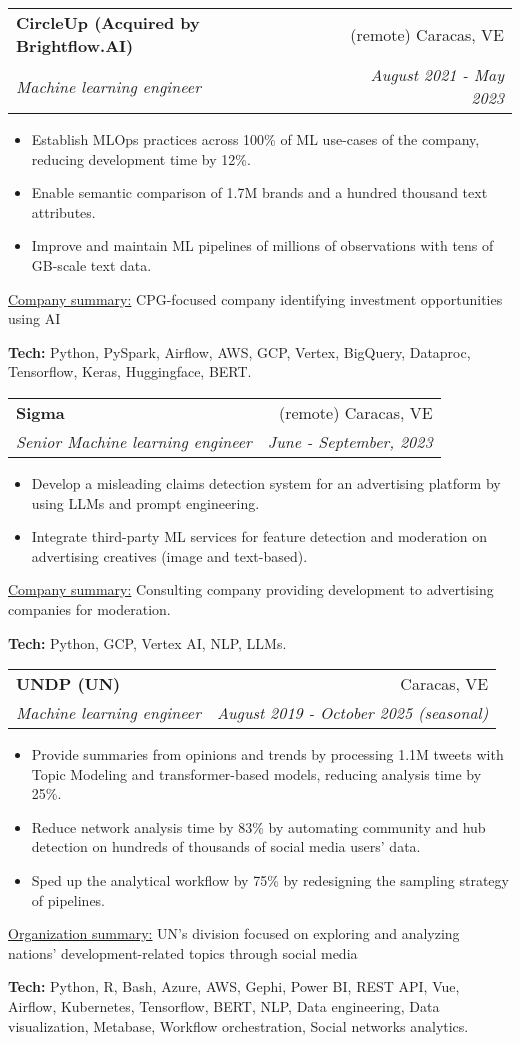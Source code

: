 \documentclass[letterpaper,11pt]{article}
\makeatletter
\newcommand{\sepsection}{\vspace{25pt}}
\newcommand{\resumeItem}[1]{%
  \item\small{
    #1
  }
}
\newcommand{\resumeSubheading}[4]{
  \vspace{8pt}\item%
    \begin{tabular*}{0.97\textwidth}[t]{l@{\extracolsep{\fill}}r}
      \textbf{#1} & #2 \\
      \textit{\small#3} & \textit{\small #4} \\
    \end{tabular*}\vspace{-5pt}
}
\newcommand{\resumeItemListStart}{\begin{itemize}}
\newcommand{\resumeItemListEnd}{\end{itemize}\vspace{-5pt}}
\newcommand{\resumeTech}[2]{
 \underline{#1:} #2
}
\makeatother
\begin{document}
    \resumeSubheading
      {CircleUp (Acquired by Brightflow.AI)}{(remote) Caracas, VE}
      {Machine learning engineer}{August 2021 - May 2023}
      \resumeItemListStart
      \resumeItem{Establish MLOps practices across 100\% of ML use-cases of the company, reducing development time by 12\%.}
      \resumeItem{Enable semantic comparison of 1.7M brands and a hundred thousand text attributes.}
      \resumeItem{Improve and maintain ML pipelines of millions of observations with tens of GB-scale text data.}
      \resumeItemListEnd
      \resumeTech{Company summary}{CPG-focused company identifying investment opportunities using AI}
      \begin{tcolorbox}
          \textbf{Tech:} Python, PySpark, Airflow, AWS, GCP, Vertex, BigQuery, Dataproc, Tensorflow, Keras, Huggingface, BERT.
      \end{tcolorbox}
    \sepsection

    \resumeSubheading
      {Sigma}{(remote) Caracas, VE}
      {Senior Machine learning engineer}{June - September, 2023}
      \resumeItemListStart
      \resumeItem{Develop a misleading claims detection system for an advertising platform by using LLMs and prompt engineering.}
      \resumeItem{Integrate third-party ML services for feature detection and moderation on advertising creatives (image and text-based).}
      \resumeItemListEnd
      \resumeTech{Company summary}{Consulting company providing development to advertising companies for moderation.}
      \begin{tcolorbox}[width=.45\linewidth]
          \textbf{Tech:} Python, GCP, Vertex AI, NLP, LLMs.
      \end{tcolorbox}
    \sepsection

    \resumeSubheading
      {UNDP (UN)}{Caracas, VE}
      {Machine learning engineer}{August 2019 - October 2025 (seasonal)}
      \resumeItemListStart
      \resumeItem{Provide summaries from opinions and trends by processing 1.1M tweets with Topic Modeling and transformer-based models, reducing analysis time by 25\%.}
      \resumeItem{Reduce network analysis time by 83\%  by automating community and hub detection on hundreds of thousands of social media users' data.}
      \resumeItem{Sped up the analytical workflow by 75\% by redesigning the sampling strategy of pipelines.}
      \resumeItemListEnd
      \resumeTech{Organization summary}{UN's division focused on exploring and analyzing nations' development-related topics through social media}
      \begin{tcolorbox}
          \textbf{Tech:} Python, R, Bash, Azure, AWS, Gephi, Power BI, REST API, Vue, Airflow, Kubernetes, Tensorflow, BERT, NLP, Data engineering, Data visualization, Metabase, Workflow orchestration, Social networks analytics.
      \end{tcolorbox}
\end{document}
